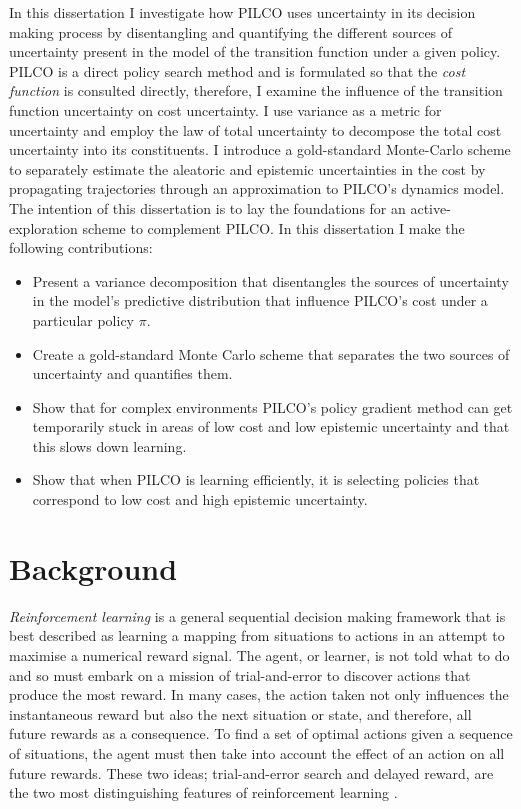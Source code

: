 In this dissertation I investigate how PILCO uses uncertainty in its decision making process by disentangling and quantifying the different sources of uncertainty present in the model of the transition function under a given policy. PILCO is a direct policy search method and is formulated so that the \textit{cost function} is consulted directly, therefore, I examine the influence of the transition function uncertainty on cost uncertainty. I use variance as a metric for uncertainty and employ the law of total uncertainty to decompose the total cost uncertainty into its constituents. I introduce a gold-standard Monte-Carlo scheme to separately estimate the aleatoric and epistemic uncertainties in the cost by propagating trajectories through an approximation to PILCO's dynamics model. The intention of this dissertation is to lay the foundations for an active-exploration scheme to complement PILCO. In this dissertation I make the following contributions:
\begin{itemize}
    \item Present a variance decomposition that disentangles the sources of uncertainty in the model's predictive distribution that influence PILCO's cost under a particular policy $\pi$.
    \item Create a gold-standard Monte Carlo scheme that separates the two sources of uncertainty and quantifies them.
    \item Show that for complex environments PILCO's policy gradient method can get temporarily stuck in areas of low cost and low epistemic uncertainty and that this slows down learning.
    \item Show that when PILCO is learning efficiently, it is selecting policies that correspond to low cost and high epistemic uncertainty. 
\end{itemize}

\section{Background} %
\label{S:background}
\textit{Reinforcement learning} is a general sequential decision making framework that is best described as learning a mapping from situations to actions in an attempt to maximise a numerical reward signal. The agent, or learner, is not told what to do and so must embark on a mission of trial-and-error to discover actions that produce the most reward. In many cases, the action taken not only influences the instantaneous reward but also the next situation or state, and therefore, all future rewards as a consequence. To find a set of optimal actions given a sequence of situations, the agent must then take into account the effect of an action on all future rewards. These two ideas; trial-and-error search and delayed reward, are the two most distinguishing features of reinforcement learning \citep{sutton2018reinforcement}.


